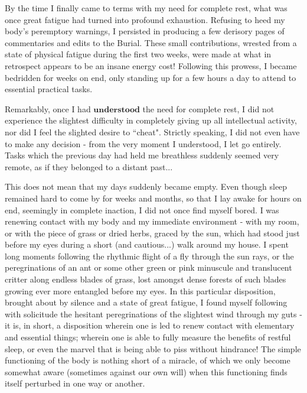 By the time I finally came to terms with my need for complete rest, what was once great fatigue had turned into profound exhaustion. Refusing to heed my body's peremptory warnings, I persisted in producing a few derisory pages of commentaries and edits to the Burial. These small contributions, wrested from a state of physical fatigue during the first two weeks, were made at what in retrospect appears to be an insane energy cost! Following this prowess, I became bedridden for weeks on end, only standing up for a few hours a day to attend to essential practical tasks.

Remarkably, once I had $\textbf{understood}$ the need for complete rest, I did not experience the slightest difficulty in completely giving up all intellectual activity, nor did I feel the slighted desire to ``cheat". Strictly speaking, I did not even have to make any decision - from the very moment I understood, I let go entirely. Tasks which the previous day had held me breathless suddenly seemed very remote, as if they belonged to a distant past...

This does not mean that my days suddenly became empty. Even though sleep remained hard to come by for weeks and months, so that I lay awake for hours on end, seemingly in complete inaction, I did not once find myself bored. I was renewing contact with my body and my immediate environment - with my room, or with the piece of grass or dried herbs, graced by the sun, which had stood just before my eyes during a short (and cautious...) walk around my house. I spent long moments following the rhythmic flight of a fly through the sun rays, or the peregrinations of an ant or some other green or pink minuscule and translucent critter along endless blades of grass, lost amongst dense forests of such blades growing ever more entangled before my eyes. In this particular disposition, brought about by silence and a state of great fatigue, I found myself following with solicitude the hesitant peregrinations of the slightest wind through my guts - it is, in short, a disposition wherein one is led to renew contact with elementary and essential things; wherein one is able to fully measure the benefits of restful sleep, or even the marvel that is being able to piss without hindrance! The simple functioning of the body is nothing short of a miracle, of which we only become somewhat aware (sometimes against our own will) when this functioning finds itself perturbed in one way or another.


